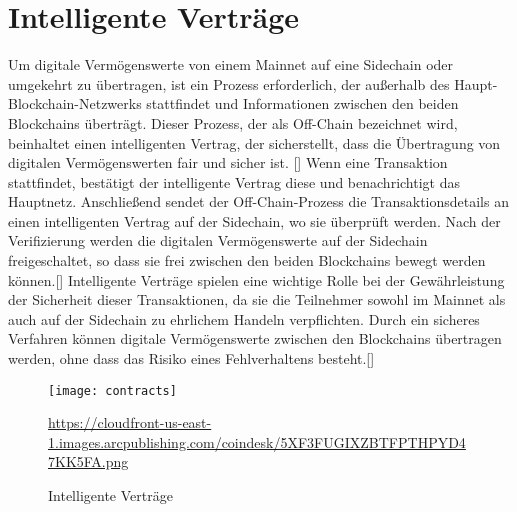 \documentclass[ngerman]{scrreprt}
\begin{document}
\section{Intelligente Verträge}
Um digitale Vermögenswerte von einem Mainnet auf eine Sidechain oder umgekehrt zu übertragen, ist ein Prozess erforderlich, der außerhalb des Haupt-Blockchain-Netzwerks stattfindet und Informationen zwischen den beiden Blockchains überträgt. Dieser Prozess, der als Off-Chain bezeichnet wird, beinhaltet einen intelligenten Vertrag, der sicherstellt, dass die Übertragung von digitalen Vermögenswerten fair und sicher ist. [\cite{coin_desk}]
Wenn eine Transaktion stattfindet, bestätigt der intelligente Vertrag diese und benachrichtigt das Hauptnetz. Anschließend sendet der Off-Chain-Prozess die Transaktionsdetails an einen intelligenten Vertrag auf der Sidechain, wo sie überprüft werden. Nach der Verifizierung werden die digitalen Vermögenswerte auf der Sidechain freigeschaltet, so dass sie frei zwischen den beiden Blockchains bewegt werden können.[\cite{coin_desk}]
Intelligente Verträge spielen eine wichtige Rolle bei der Gewährleistung der Sicherheit dieser Transaktionen, da sie die Teilnehmer sowohl im Mainnet als auch auf der Sidechain zu ehrlichem Handeln verpflichten. Durch ein sicheres Verfahren können digitale Vermögenswerte zwischen den Blockchains übertragen werden, ohne dass das Risiko eines Fehlverhaltens besteht.[\cite{coin_desk}]

\begin{figure}[H]
	\texttt{[image: contracts]}
	\caption{Intelligente Verträge}
	\small{\url{https://cloudfront-us-east-1.images.arcpublishing.com/coindesk/5XF3FUGIXZBTFPTHPYD47KK5FA.png}}
\end{figure}
\end{document}
